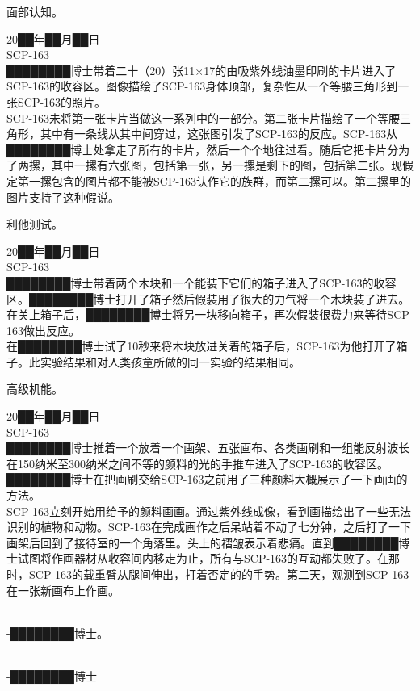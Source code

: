 面部认知。

20██年██月██日\\
SCP-163\\
████████博士带着二十（20）张11×17的由吸紫外线油墨印刷的卡片进入了SCP-163的收容区。图像描绘了SCP-163身体顶部，复杂性从一个等腰三角形到一张SCP-163的照片。\\
SCP-163未将第一张卡片当做这一系列中的一部分。第二张卡片描绘了一个等腰三角形，其中有一条线从其中间穿过，这张图引发了SCP-163的反应。SCP-163从████████博士处拿走了所有的卡片，然后一个个地往过看。随后它把卡片分为了两摞，其中一摞有六张图，包括第一张，另一摞是剩下的图，包括第二张。现假定第一摞包含的图片都不能被SCP-163认作它的族群，而第二摞可以。第二摞里的图片支持了这种假说。

利他测试。

20██年██月██日\\
SCP-163\\
████████博士带着两个木块和一个能装下它们的箱子进入了SCP-163的收容区。████████博士打开了箱子然后假装用了很大的力气将一个木块装了进去。在关上箱子后，████████博士将另一块移向箱子，再次假装很费力来等待SCP-163做出反应。\\
在████████博士试了10秒来将木块放进关着的箱子后，SCP-163为他打开了箱子。此实验结果和对人类孩童所做的同一实验的结果相同。

高级机能。

20██年██月██日\\
SCP-163\\
████████博士推着一个放着一个画架、五张画布、各类画刷和一组能反射波长在150纳米至300纳米之间不等的颜料的光的手推车进入了SCP-163的收容区。████████博士在把画刷交给SCP-163之前用了三种颜料大概展示了一下画画的方法。\\
SCP-163立刻开始用给予的颜料画画。通过紫外线成像，看到画描绘出了一些无法识别的植物和动物。SCP-163在完成画作之后呆站着不动了七分钟，之后打了一下画架后回到了接待室的一个角落里。头上的褶皱表示着悲痛。直到████████博士试图将作画器材从收容间内移走为止，所有与SCP-163的互动都失败了。在那时，SCP-163的载重臂从腿间伸出，打着否定的的手势。第二天，观测到SCP-163在一张新画布上作画。

\\
-████████博士。

\\
-████████博士
